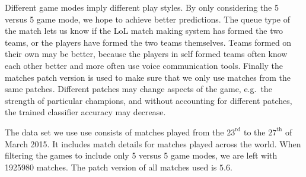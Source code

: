 Different game modes imply different play styles. By only considering the 5 versus 5 game mode, we hope to achieve better predictions.
The queue type of the match lets us know if the LoL match making system has formed the two teams, or the players have formed the two teams themselves.
Teams formed on their own may be better, because the players in self formed teams often know each other better and more often use voice communication tools.
Finally the matches patch version is used to make sure that we only use matches from the same patches. Different patches may change aspects of the game, e.g.\ the strength of particular champions, and without accounting for different patches, the trained classifier accuracy may decrease.  

The data set we use use consists of matches played from the $23^{\text{rd}}$ to the $27^{\text{th}}$ of March 2015. It includes match details for matches played across the world. When filtering the games to include only 5 versus 5 game modes, we are left with 1925980 matches. The patch version of all matches used is $5.6$.


